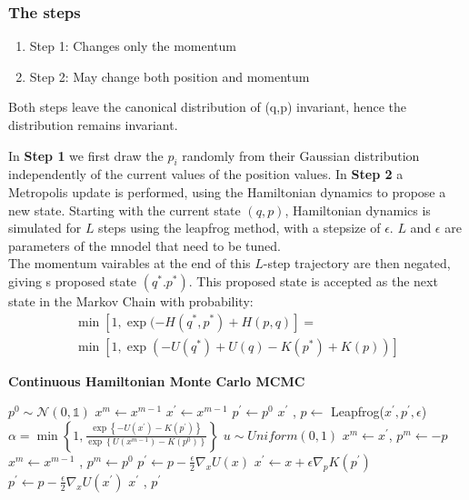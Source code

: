 \documentclass[twoside]{article}
\begin{document}
\subsubsection{The steps}

\begin{enumerate}
	\item Step 1: Changes only the momentum
	\item Step 2: May change both position and momentum
\end{enumerate}
Both steps leave the canonical distribution of (q,p) invariant, hence the distribution remains invariant.

In \textbf{Step 1} we first draw the $p_{i}$ randomly from their Gaussian distribution independently of the current values of the position values. 
In \textbf{Step 2} a Metropolis update is performed, using the Hamiltonian dynamics to propose a new state. Starting with the current state $(q,p)$, Hamiltonian dynamics is simulated for $L$ steps using the leapfrog method, with a stepsize of $\epsilon$. $L$ and $\epsilon$ are parameters of the mnodel that need to be tuned.\\
The momentum vairables at the end of this $L$-step trajectory are then negated, giving s proposed state $(q^{*}. p^{*})$. This proposed state is accepted as the next state in the Markov Chain with probability: \begin{multline}
\min[1, \exp(-H(q^{*}, p^{*}) + H(p,q)] =\\
 \min[1, \exp(-U(q^{*}) + U(q) - K(p^{*}) + K(p))]
\end{multline} 
\begin{algorithm}
	\label{alg:simpHMC}
	\caption{\textbf{Continuous Hamiltonian Monte Carlo MCMC}}
	\begin{algorithmic}[1]
		\State $ p^{0} \sim \mathcal{N}(0,\mathds{1})$
		\State $ x^{m} \gets x^{m-1}$
		\State $x^{'} \gets x^{m-1}$
		\State $ p^{'} \gets p^{0}$
		\State $x^{'}$ , $p \gets$ Leapfrog($x^{'}, p^{'}, \epsilon$)
		\EndFor
		\State $\alpha = \min\left\{1, \frac{\exp \left\{-U(x^{'}) - K(p^{'})\right\}}{\exp \left\{U(x^{m-1}) - K(p^{0})\right\}}\right\}$
		\State $u \sim Uniform(0,1)$
		\State \Return $ x^{m} \gets x^{'}$, $p^{m} \gets -p $  
		\Else
		\State \Return $x^{m}  \gets x^{m-1}$ , $p^{m} \gets p^{0}$ 
		\EndIf
		\EndFor
		\State $p^{'} \gets p - \frac{\epsilon}{2}\nabla_{x} U(x)$ 
		\State $x^{'} \gets x + \epsilon \nabla_{p} K(p^{'})$  
		\State $p^{'} \gets p - \frac{\epsilon}{2}\nabla_{x}U(x^{'})$ 
		\State \Return $x^{'}$ , $p^{'}$
	\end{algorithmic} 
\end{algorithm}
\end{document}
